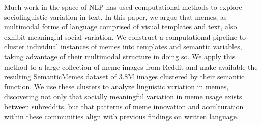 Much work in the space of NLP has used computational methods to explore sociolinguistic variation in text.  In this paper, we argue that memes, as multimodal forms of language comprised of visual templates and text, also exhibit meaningful social variation. We construct a computational pipeline to cluster individual instances of memes into templates and semantic variables, taking advantage of their multimodal structure in doing so. We apply this method to a large collection of meme images  from Reddit and make available the resulting SemanticMemes dataset of 3.8M images clustered by their semantic function. We use these clusters to analyze linguistic variation in memes, discovering  not only that socially meaningful variation in meme usage exists between subreddits, but that patterns of meme innovation and acculturation within these communities align with previous findings on written language.